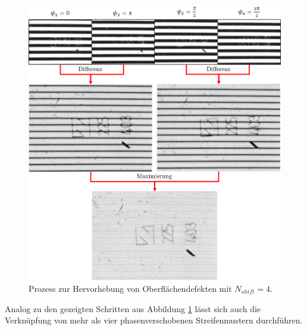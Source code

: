 \begin{figure}[H]
	\centering
	\includegraphics[width=\textwidth]{03_sichtpruefungDurchLichtstreuung/optimierungen/figures/imageTree}
	\caption[Prozess der Hervorhebung von Oberflächendefekten]{Prozess zur Hervorhebung von Oberflächendefekten mit $N_{shift} = 4$.}
	\label{img:imageTree}
\end{figure}

\noindent
Analog zu den gezeigten Schritten aus Abbildung \ref{img:imageTree} lässt sich auch die Verknüpfung von mehr als vier phasenverschobenen Streifenmustern durchführen.